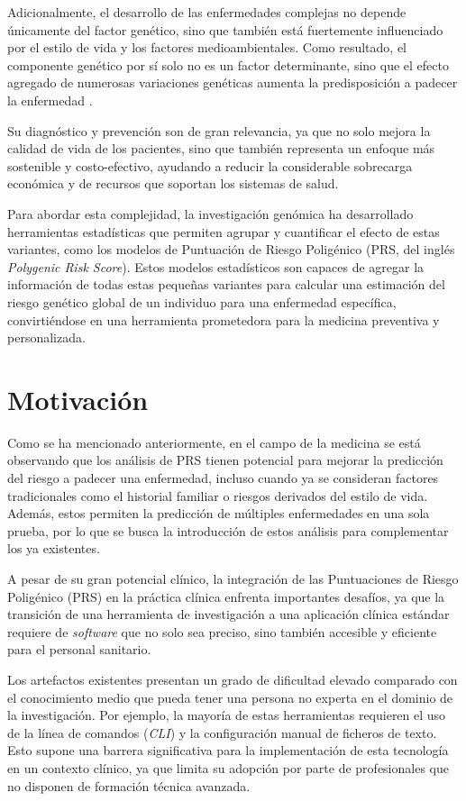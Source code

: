 Adicionalmente, el desarrollo de las enfermedades complejas no depende únicamente del factor genético, sino que también está fuertemente influenciado por el estilo de vida y los factores medioambientales. Como resultado, el componente genético por sí solo no es un factor determinante, sino que el efecto agregado de numerosas variaciones genéticas aumenta la predisposición a padecer la enfermedad \cite{ye}. 

Su diagnóstico y prevención son de gran relevancia, ya que no solo mejora la calidad de vida de los pacientes, sino que también representa un enfoque más sostenible y costo-efectivo, ayudando a reducir la considerable sobrecarga económica y de recursos que soportan los sistemas de salud.  

Para abordar esta complejidad, la investigación genómica ha desarrollado herramientas estadísticas que permiten agrupar y cuantificar el efecto de estas variantes, como los modelos de Puntuación de Riesgo Poligénico (PRS, del inglés \textit{Polygenic Risk Score})\cite{lewis}. Estos modelos estadísticos son capaces de agregar la información de todas estas pequeñas variantes para calcular una estimación del riesgo genético global de un individuo para una enfermedad específica, convirtiéndose en una herramienta prometedora para la medicina preventiva y personalizada.


\section{Motivación}

Como se ha mencionado anteriormente, en  el campo de la medicina se está observando que los análisis de PRS tienen potencial para mejorar la predicción del riesgo a padecer una enfermedad, incluso cuando ya se consideran factores tradicionales como el historial familiar o riesgos derivados del estilo de vida. Además, estos permiten la predicción de múltiples enfermedades en una sola prueba, por lo que se busca la introducción de estos análisis para complementar los ya existentes. 

A pesar de su gran potencial clínico, la integración de las Puntuaciones de Riesgo Poligénico (PRS) en la práctica clínica enfrenta importantes desafíos, ya que la transición de una herramienta de investigación a una aplicación clínica estándar requiere de \textit{software} que no solo sea preciso, sino también accesible y eficiente para el personal sanitario.

Los artefactos existentes presentan un grado de dificultad elevado comparado con el conocimiento medio que pueda tener una persona no experta en el dominio de la investigación. Por ejemplo, la mayoría de estas herramientas requieren el uso de la línea de comandos (\textit{CLI}) y la configuración manual de ficheros de texto. Esto supone una barrera significativa para la implementación de esta tecnología en un contexto clínico, ya que limita su adopción por parte de profesionales que no disponen de formación técnica avanzada. 

